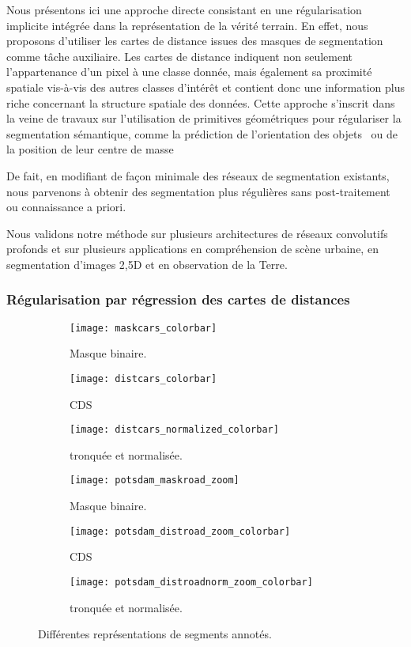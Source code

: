 Nous présentons ici une approche directe consistant en une régularisation implicite intégrée dans la représentation de la vérité terrain. En effet, nous proposons d'utiliser les cartes de distance issues des masques de segmentation comme tâche auxiliaire. Les cartes de distance indiquent non seulement l'appartenance d'un pixel à une classe donnée, mais également sa proximité spatiale vis-à-vis des autres classes d'intérêt et contient donc une information plus riche concernant la structure spatiale des données. Cette approche s'inscrit dans la veine de travaux sur l'utilisation de primitives géométriques pour régulariser la segmentation sémantique, comme la prédiction de l'orientation des objets~\cite{uhrig_pixel-level_2016} ou de la position de leur centre de masse~\cite{hayder_boundary-aware_2017}

De fait, en modifiant de façon minimale des réseaux de segmentation existants, nous parvenons à obtenir des segmentation plus régulières sans post-traitement ou connaissance a priori.

Nous validons notre méthode sur plusieurs architectures de réseaux convolutifs profonds et sur plusieurs applications en compréhension de scène urbaine, en segmentation d'images 2,5D et en observation de la Terre.

\subsubsection{Régularisation par régression des cartes de distances}
\begin{figure}[!t]
    \begin{subfigure}{0.33\textwidth}
    	\texttt{[image: maskcars\_colorbar]}
        \caption{Masque binaire.}
    \end{subfigure}
    \begin{subfigure}{0.33\textwidth}
    	\texttt{[image: distcars\_colorbar]}
        \caption{\Glsdesc{CDS}}
    \end{subfigure}
    \begin{subfigure}{0.33\textwidth}
    	\texttt{[image: distcars\_normalized\_colorbar]}
        \caption{ tronquée et normalisée.}
    \end{subfigure}

	\begin{subfigure}{0.33\textwidth}
    	\texttt{[image: potsdam\_maskroad\_zoom]}
        \caption{Masque binaire.}
    \end{subfigure}
    \begin{subfigure}{0.33\textwidth}
    	\texttt{[image: potsdam\_distroad\_zoom\_colorbar]}
        \caption{\Glsdesc{CDS}}
    \end{subfigure}
    \begin{subfigure}{0.33\textwidth}
    	\texttt{[image: potsdam\_distroadnorm\_zoom\_colorbar]}
        \caption{ tronquée et normalisée.}
    \end{subfigure}
    \caption{Différentes représentations de segments annotés.}
    \label{fig:representations}
\end{figure}

